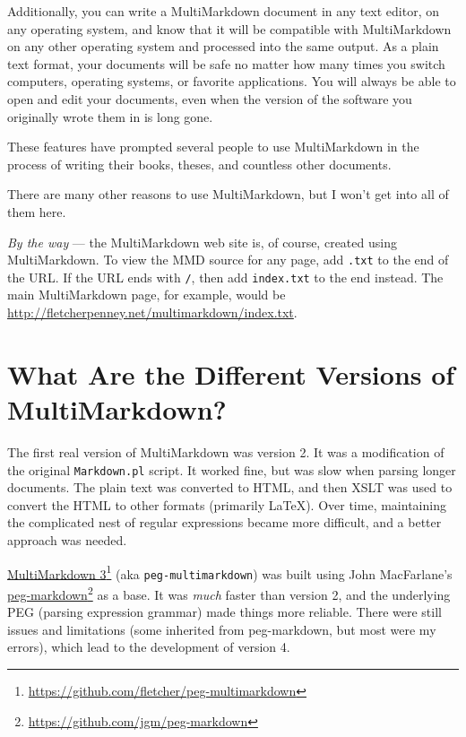 Additionally, you can write a MultiMarkdown document in any text editor, on any operating system, and know that it will be compatible with MultiMarkdown on any other operating system and processed into the same output. As a plain text format, your documents will be safe no matter how many times you switch computers, operating systems, or favorite applications. You will always be able to open and edit your documents, even when the version of the software you originally wrote them in is long gone.

These features have prompted several people to use MultiMarkdown in the process of writing their books, theses, and countless other documents.

There are many other reasons to use MultiMarkdown, but I won't get into all of them here.

\emph{By the way} --- the MultiMarkdown web site is, of course, created using MultiMarkdown. To view the \gls{MMD} source for any page, add \texttt{.txt} to the end of the URL. If the URL ends with \texttt{\slash }, then add \texttt{index.txt} to the end instead. The main MultiMarkdown page, for example, would be \href{http://fletcherpenney.net/multimarkdown/index.txt}{http:\slash \slash fletcherpenney.net\slash multimarkdown\slash index.txt}.

\section{What Are the Different Versions of MultiMarkdown? }
\label{whatarethedifferentversionsofmultimarkdown}

The first real version of MultiMarkdown was version 2. It was a modification of the original \texttt{Markdown.pl} script. It worked fine, but was slow when parsing longer documents. The plain text was converted to HTML, and then XSLT was used to convert the HTML to other formats (primarily LaTeX). Over time, maintaining the complicated nest of regular expressions became more difficult, and a better approach was needed.

\href{https://github.com/fletcher/peg-multimarkdown}{MultiMarkdown 3}\footnote{\href{https://github.com/fletcher/peg-multimarkdown}{https:\slash \slash github.com\slash fletcher\slash peg-multimarkdown}} (aka \texttt{peg-multimarkdown}) was built using John MacFarlane's \href{https://github.com/jgm/peg-markdown}{peg-markdown}\footnote{\href{https://github.com/jgm/peg-markdown}{https:\slash \slash github.com\slash jgm\slash peg-markdown}} as a base. It was \emph{much} faster than version 2, and the underlying PEG (parsing expression grammar) made things more reliable. There were still issues and limitations (some inherited from peg-markdown, but most were my errors), which lead to the development of version 4.

